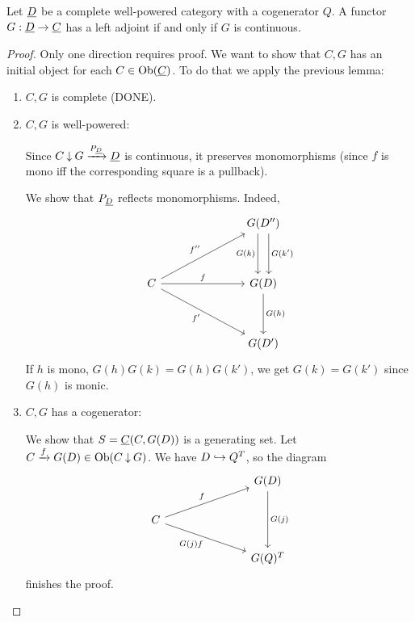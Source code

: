 \begin{theorem*}[SAFT]
	Let \( \underline{D} \) be a complete well-powered category with a cogenerator \( Q \). A functor \( G: \underline{D} \to \underline{C} \) has a left adjoint if and only if \( G \) is continuous.
\end{theorem*}
\begin{proof}
	Only one direction requires proof. We want to show that \( C \comma G \) has an initial object for each \( C \in \operatorname{Ob}(\underline{C}) \). To do that we apply the previous lemma:
	\begin{enumerate}
		\item \( C \comma G \) is complete (DONE).
		\item \( C \comma G \) is well-powered:

			Since \( C \mathbin{\downarrow} G \xrightarrow{P_{\underline{D}}} \underline{D} \) is continuous, it preserves monomorphisms (since \( f \) is mono iff the corresponding square is a pullback).

			\vspace*{2mm}

			We show that \( P_{\underline{D}} \) reflects monomorphisms. Indeed,
			\[
				\begin{tikzcd}
					&&& {G(D'')} \\
					\\
					C &&& {G(D)} \\
					\\
					&&& {G(D')}
					\arrow["{G(k)}"', shift right=2, from=1-4, to=3-4]
					\arrow["{G(k')}", shift left=2, from=1-4, to=3-4]
					\arrow["{f''}", from=3-1, to=1-4]
					\arrow["f", from=3-1, to=3-4]
					\arrow["{f'}"', from=3-1, to=5-4]
					\arrow["{G(h)}", from=3-4, to=5-4]
				\end{tikzcd}
			\]
			If \( h \) is mono, \( G(h) G(k) = G(h) G(k') \), we get \( G(k) = G(k') \) since \( G(h) \) is monic.
		\item \( C \comma G \) has a cogenerator:

			\vspace*{2mm}

			We show that \( S = \underline{C}(C, G(D)) \) is a generating set. Let \( C \xrightarrow{f} G(D) \in \operatorname{Ob}(C \mathbin{\downarrow} G) \). We have \( D \hookrightarrow Q^T \), so the diagram
			\[
				\begin{tikzcd}
					&&& {G(D)} \\
					C \\
					&&& {G(Q)^T}
					\arrow["{G(j)}", from=1-4, to=3-4]
					\arrow["f", from=2-1, to=1-4]
					\arrow["{G(j) f}"', from=2-1, to=3-4]
				\end{tikzcd}
			\]
			finishes the proof.
	\end{enumerate}

\end{proof}